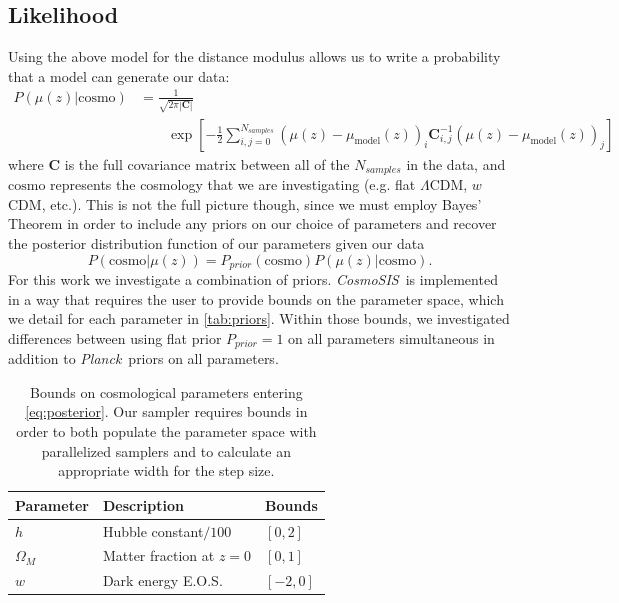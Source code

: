 \documentclass[12pt,a4paper]{article}
\newcommand\Planck{{\it Planck}\ }
\newcommand\CosmoSIS{{\it CosmoSIS}\ }
\begin{document}
\subsection{Likelihood}
\label{sec:likelihood}
Using the above model for the distance modulus allows us to write a
probability that a model can generate our data:
%
\begin{align}
  \label{eq:likelihood}
  P(\mu(z)|\mathrm{cosmo}) &= \frac{1}{\sqrt{2\pi|\mathbf{C}|}}\nonumber \\
  &\qquad{}\exp\left[-\frac{1}{2} \sum_{i,j=0}^{N_{samples}}\left(\mu(z) - \mu_{\mathrm{model}}(z)\right)_i 
    \mathbf{C}^{-1}_{i,j}\left(\mu(z) - \mu_{\mathrm{model}}(z)\right)_j\right]
\end{align}
%
where $\mathbf{C}$ is the full covariance matrix between all of the $N_{samples}$ 
in the data, and $\mathrm{cosmo}$ represents the cosmology that we are investigating
(e.g. flat $\Lambda$CDM, $w$CDM, etc.). 
This is not the full picture though, since we must employ
Bayes' Theorem in order to include any priors on our choice of 
parameters and recover the posterior distribution function of our
parameters given our data
%
\begin{equation}
  \label{eq:posterior}
  P(\mathrm{cosmo}|\mu(z)) = P_{prior}(\mathrm{cosmo}) P(\mu(z)|\mathrm{cosmo}).
\end{equation}
%
For this work we investigate a combination of priors. \CosmoSIS is implemented
in a way that requires the user to provide bounds on the parameter space, which we
detail for each parameter in \autoref{tab:priors}.
Within those bounds, we investigated differences between using flat prior $P_{prior}=1$ on
all parameters simultaneous in addition to \Planck priors on all parameters.

\begin{table}
  \centering
  \begin{tabular}{lll}
    Parameter & Description & Bounds \\ \hline
    $h$ & Hubble constant$/100$ & $[0,2]$ \\
    $\Omega_M$ & Matter fraction at $z=0$ & $[0,1]$ \\
    $w$ & Dark energy E.O.S. & $[-2,0]$\\
  \end{tabular}
  \caption{Bounds on cosmological parameters 
    entering \autoref{eq:posterior}. Our sampler requires
    bounds in order to both populate the parameter space with
    parallelized samplers and to calculate an appropriate width
    for the step size.}
  \label{tab:priors}
\end{table}
\end{document}
